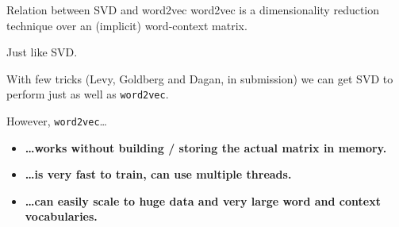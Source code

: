 \documentclass[compress]{beamer}
\begin{document}
\begin{frame}{Relation between SVD and word2vec}
word2vec is a dimensionality reduction technique over an (implicit) word-context
matrix.

\vspace{1em}

Just like SVD.

\vspace{1em}
With few tricks {\footnotesize(Levy, Goldberg and Dagan, in submission)}
we can get SVD to perform just as well as \texttt{word2vec}.

\pause
\vspace{1em}
However, \texttt{word2vec}\ldots

\begin{itemize}
    \item \textbf{\ldots works without building / storing the actual matrix in memory.}
    \item \textbf{\ldots is very fast to train, can use multiple threads.}
    \item \textbf{\ldots can easily scale to huge data and very large word
and context vocabularies.}
\end{itemize}
\end{frame}

\end{document}
